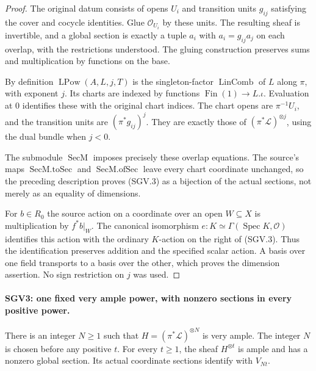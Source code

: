 \begin{proof}
The original datum consists of opens $U_i$ and transition units
$g_{ij}$ satisfying the cover and cocycle identities.  Glue
$\mathcal O_{U_i}$ by these units.  The resulting sheaf is invertible,
and a global section is exactly a tuple $a_i$ with
$a_i=g_{ij}a_j$ on each overlap, with the restrictions understood.
The gluing construction preserves sums and multiplication by
functions on the base.

By definition $\operatorname{LPow}(A,L,j,T)$ is the
singleton-factor $\operatorname{LinComb}$ of $L$ along $\pi$,
with exponent $j$.  Its charts are indexed by functions
$\operatorname{Fin}(1)\to L.\iota$.  Evaluation at $0$ identifies
these with the original chart indices.  The chart opens are
$\pi^{-1}U_i$, and the transition units are $(\pi^*g_{ij})^j$.
They are exactly those of $(\pi^*\mathcal L)^{\otimes j}$,
using the dual bundle when $j<0$.

The submodule $\operatorname{SecM}$ imposes precisely these overlap
equations.  The source's maps $\operatorname{SecM.toSec}$ and
$\operatorname{SecM.ofSec}$ leave every chart coordinate unchanged,
so the preceding description proves (SGV.3) as a bijection of the
actual sections, not merely as an equality of dimensions.

For $b\in R_0$ the source action on a coordinate over an open
$W\subseteq X$ is multiplication by $f^*b|_W$.
The canonical isomorphism
$e:K\simeq\Gamma(\operatorname{Spec}K,\mathcal O)$ identifies
this action with the ordinary $K$-action on the right of (SGV.3).
Thus the identification preserves addition and the specified scalar
action.  A basis over one field transports to a basis over the other,
which proves the dimension assertion.  No sign restriction on $j$
was used.
\end{proof}

\paragraph{SGV3: one fixed very ample power, with nonzero sections in every positive power.}
\label{claim:SGV3}
There is an integer $N\ge1$ such that
$H=(\pi^*\mathcal L)^{\otimes N}$ is very ample.
The integer $N$ is chosen before any positive $t$.  For every
$t\ge1$, the sheaf $H^{\otimes t}$ is ample and has a nonzero
global section.  Its actual coordinate sections identify with $V_{Nt}$.

